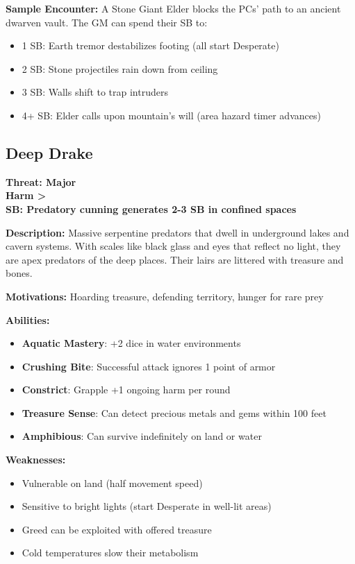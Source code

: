 \documentclass[12pt]{article}
\newcommand{\cp}[1]{\textbf{SB: #1}}
\newcommand{\harm}[1]{\textbf{Harm #1}}
\newcommand{\threat}[1]{\textbf{Threat: #1}}
\begin{document}
\textbf{Sample Encounter:}
A Stone Giant Elder blocks the PCs' path to an ancient dwarven vault. The GM can spend their SB to:
\begin{itemize}
\item 1 SB: Earth tremor destabilizes footing (all start Desperate)
\item 2 SB: Stone projectiles rain down from ceiling
\item 3 SB: Walls shift to trap intruders
\item 4+ SB: Elder calls upon mountain's will (area hazard timer advances)
\end{itemize}

\subsection*{Deep Drake}

\threat{Major} \\
\harm{>} \\
\cp{Predatory cunning generates 2-3 SB in confined spaces}

\vspace{0.5em}
\textbf{Description:} Massive serpentine predators that dwell in underground lakes and cavern systems. With scales like black glass and eyes that reflect no light, they are apex predators of the deep places. Their lairs are littered with treasure and bones.

\textbf{Motivations:} Hoarding treasure, defending territory, hunger for rare prey

\textbf{Abilities:}
\begin{itemize}
\item \textbf{Aquatic Mastery}: +2 dice in water environments
\item \textbf{Crushing Bite}: Successful attack ignores 1 point of armor
\item \textbf{Constrict}: Grapple +1 ongoing harm per round
\item \textbf{Treasure Sense}: Can detect precious metals and gems within 100 feet
\item \textbf{Amphibious}: Can survive indefinitely on land or water
\end{itemize}

\textbf{Weaknesses:}
\begin{itemize}
\item Vulnerable on land (half movement speed)
\item Sensitive to bright lights (start Desperate in well-lit areas)
\item Greed can be exploited with offered treasure
\item Cold temperatures slow their metabolism
\end{itemize}
\end{document}

